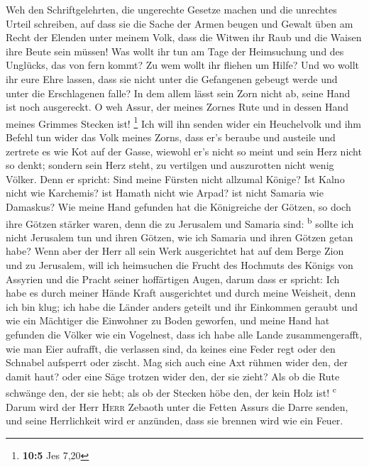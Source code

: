  Weh den Schriftgelehrten, die ungerechte Gesetze machen
und die unrechtes Urteil schreiben,  auf dass sie die
Sache der Armen beugen und Gewalt üben am Recht der Elenden unter meinem
Volk, dass die Witwen ihr Raub und die Waisen ihre Beute sein müssen!
 Was wollt ihr tun am Tage der Heimsuchung und des
Unglücks, das von fern kommt? Zu wem wollt ihr fliehen um Hilfe? Und wo
wollt ihr eure Ehre lassen,  dass sie nicht unter die
Gefangenen gebeugt werde und unter die Erschlagenen falle? In dem allem
lässt sein Zorn nicht ab, seine Hand ist noch ausgereckt. 
O weh Assur, der meines Zornes Rute und in dessen Hand meines Grimmes
Stecken ist! \footnote{\textbf{10:5} Jes 7,20}  Ich will
ihn senden wider ein Heuchelvolk und ihm Befehl tun wider das Volk
meines Zorns, dass er's beraube und austeile und zertrete es wie Kot auf
der Gasse,  wiewohl er's nicht so meint und sein Herz
nicht so denkt; sondern sein Herz steht, zu vertilgen und auszurotten
nicht wenig Völker.  Denn er spricht: Sind meine Fürsten
nicht allzumal Könige?  Ist Kalno nicht wie Karchemis? ist
Hamath nicht wie Arpad? ist nicht Samaria wie Damaskus? 
Wie meine Hand gefunden hat die Königreiche der Götzen, so doch ihre
Götzen stärker waren, denn die zu Jerusalem und Samaria sind:
\textsuperscript{b}  sollte ich nicht Jerusalem tun und
ihren Götzen, wie ich Samaria und ihren Götzen getan habe?
 Wenn aber der Herr all sein Werk ausgerichtet hat auf
dem Berge Zion und zu Jerusalem, will ich heimsuchen die Frucht des
Hochmuts des Königs von Assyrien und die Pracht seiner hoffärtigen
Augen,  darum dass er spricht: Ich habe es durch meiner
Hände Kraft ausgerichtet und durch meine Weisheit, denn ich bin klug;
ich habe die Länder anders geteilt und ihr Einkommen geraubt und wie ein
Mächtiger die Einwohner zu Boden geworfen,  und meine
Hand hat gefunden die Völker wie ein Vogelnest, dass ich habe alle Lande
zusammengerafft, wie man Eier aufrafft, die verlassen sind, da keines
eine Feder regt oder den Schnabel aufsperrt oder zischt. 
Mag sich auch eine Axt rühmen wider den, der damit haut? oder eine Säge
trotzen wider den, der sie zieht? Als ob die Rute schwänge den, der sie
hebt; als ob der Stecken höbe den, der kein Holz ist!
\textsuperscript{c}  Darum wird der Herr \textsc{Herr}
Zebaoth unter die Fetten Assurs die Darre senden, und seine Herrlichkeit
wird er anzünden, dass sie brennen wird wie ein Feuer. 

